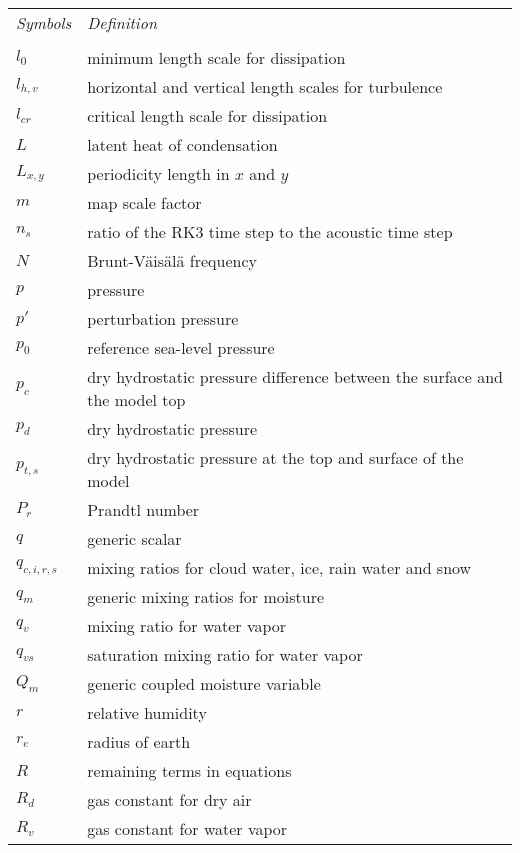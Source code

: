 \newpage
\vskip 5pt
\begin{tabular}{ l p{5.5in} }

{\em Symbols}  & {\em Definition} \\
\\
$l_0$          & minimum length scale for dissipation \\
$l_{h,v}$      & horizontal and vertical length scales for turbulence \\
$l_{cr}$       & critical length scale for dissipation \\
$L$            & latent heat of condensation \\
$L_{x,y}$      & periodicity length in $x$ and $y$ \\
$m$            & map scale factor \\ 
$n_s$          & ratio of the RK3 time step to the acoustic time step \\
$N$            & Brunt-V\"ais\"al\"a frequency \\
$p$            & pressure \\
$p'$           & perturbation pressure \\
$p_0$          & reference sea-level pressure \\
$p_c$        & dry hydrostatic pressure difference between the surface and the model top \\
$p_d$          & dry hydrostatic pressure \\
$p_{t,s}$  & dry hydrostatic pressure at the top and surface of the model \\
$P_r$          & Prandtl number \\
$q$            & generic scalar \\
$q_{c,i,r,s}$  & mixing ratios for cloud water, ice, rain water and snow \\
$q_m$          & generic mixing ratios for moisture \\
$q_v$          & mixing ratio for water vapor \\
$q_{vs}$       & saturation mixing ratio for water vapor \\
$Q_m$          & generic coupled moisture variable \\
$r$            & relative humidity   \\
$r_e$          & radius of earth \\
$R$            & remaining terms in equations  \\
$R_d$          & gas constant for dry air \\
$R_v$          & gas constant for water vapor \\

\end{tabular}
